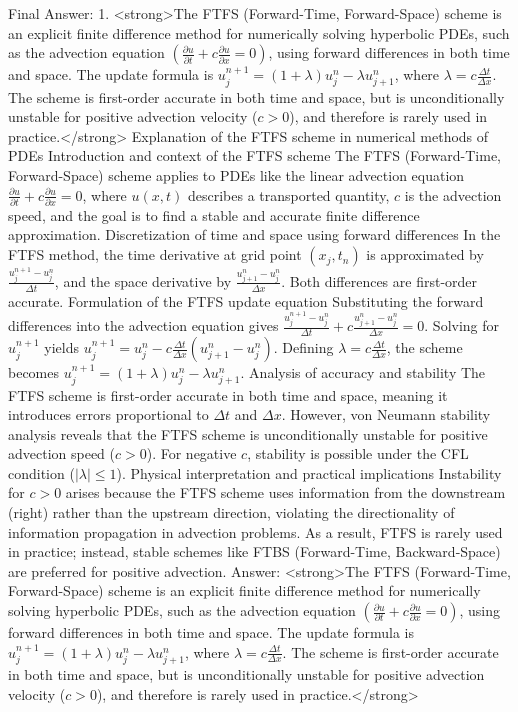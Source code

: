 \documentclass[12pt,a4paper]{report}
\begin{document}
\begin{itemize}
Final Answer:
1. <strong>The FTFS (Forward-Time, Forward-Space) scheme is an explicit finite difference method for numerically solving hyperbolic PDEs, such as the advection equation \(\left( \frac{\partial u}{\partial t} + c \frac{\partial u}{\partial x} = 0 \right)\), using forward differences in both time and space. The update formula is \(u_j^{n+1} = (1 + \lambda) u_j^n - \lambda u_{j+1}^n\), where \(\lambda = c \frac{\Delta t}{\Delta x}\). The scheme is first-order accurate in both time and space, but is unconditionally unstable for positive advection velocity (\(c > 0\)), and therefore is rarely used in practice.</strong>
Explanation of the FTFS scheme in numerical methods of PDEs
Introduction and context of the FTFS scheme
The FTFS (Forward-Time, Forward-Space) scheme applies to PDEs like the linear advection equation \(\frac{\partial u}{\partial t} + c \frac{\partial u}{\partial x} = 0\), where \(u(x, t)\) describes a transported quantity, \(c\) is the advection speed, and the goal is to find a stable and accurate finite difference approximation.
Discretization of time and space using forward differences
In the FTFS method, the time derivative at grid point \((x_j, t_n)\) is approximated by \(\frac{u_j^{n+1} - u_j^n}{\Delta t}\), and the space derivative by \(\frac{u_{j+1}^n - u_j^n}{\Delta x}\). Both differences are first-order accurate.
Formulation of the FTFS update equation
Substituting the forward differences into the advection equation gives \(\frac{u_j^{n+1} - u_j^n}{\Delta t} + c \frac{u_{j+1}^n - u_j^n}{\Delta x} = 0\). Solving for \(u_j^{n+1}\) yields \(u_j^{n+1} = u_j^n - c \frac{\Delta t}{\Delta x} (u_{j+1}^n - u_j^n)\). Defining \(\lambda = c \frac{\Delta t}{\Delta x}\), the scheme becomes \(u_j^{n+1} = (1 + \lambda) u_j^n - \lambda u_{j+1}^n\).
Analysis of accuracy and stability
The FTFS scheme is first-order accurate in both time and space, meaning it introduces errors proportional to \(\Delta t\) and \(\Delta x\). However, von Neumann stability analysis reveals that the FTFS scheme is unconditionally unstable for positive advection speed (\(c > 0\)). For negative \(c\), stability is possible under the CFL condition (\(|\lambda| \leq 1\)).
Physical interpretation and practical implications
Instability for \(c > 0\) arises because the FTFS scheme uses information from the downstream (right) rather than the upstream direction, violating the directionality of information propagation in advection problems. As a result, FTFS is rarely used in practice; instead, stable schemes like FTBS (Forward-Time, Backward-Space) are preferred for positive advection.
Answer: <strong>The FTFS (Forward-Time, Forward-Space) scheme is an explicit finite difference method for numerically solving hyperbolic PDEs, such as the advection equation \(\left( \frac{\partial u}{\partial t} + c \frac{\partial u}{\partial x} = 0 \right)\), using forward differences in both time and space. The update formula is \(u_j^{n+1} = (1 + \lambda) u_j^n - \lambda u_{j+1}^n\), where \(\lambda = c \frac{\Delta t}{\Delta x}\). The scheme is first-order accurate in both time and space, but is unconditionally unstable for positive advection velocity (\(c > 0\)), and therefore is rarely used in practice.</strong>

\end{itemize}
\end{document}
